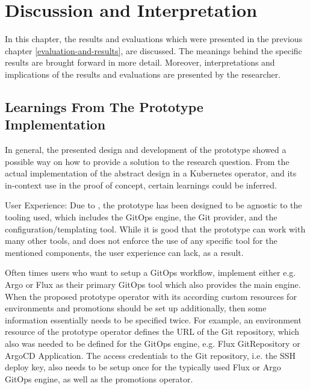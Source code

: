 \chapter{Discussion and Interpretation}
\label{discussion-and-interpretation}

In this chapter,
the results and evaluations which were presented in the previous chapter \ref{evaluation-and-results},
are discussed. The meanings behind the specific results are brought forward in more detail.
Moreover, interpretations and implications of the results and evaluations are presented by the researcher.


\section*{Learnings From The Prototype Implementation}

In general, the presented design and development of the prototype
showed a possible way on how to provide a solution to the research question.
From the actual implementation of the abstract design in a Kubernetes operator,
and its in-context use in the proof of concept,
certain learnings could be inferred.

User Experience:
Due to ,
the prototype has been designed to be agnostic to the tooling used, which includes the GitOps engine, the Git provider, and the configuration/templating tool.
While it is good that the prototype can work with many other tools,
and does not enforce the use of any specific tool for the mentioned components,
the user experience can lack, as a result.

Often times users who want to setup a GitOps workflow,
implement either e.g. Argo or Flux as their primary GitOps tool which also provides the main engine.
When the proposed prototype operator with its according custom resources for environments and promotions
should be set up additionally,
then some information essentially needs to be specified twice. For example,
an environment resource of the prototype operator defines the URL of the Git repository,
which also was needed to be defined for the GitOps engine, e.g. Flux GitRepository or ArgoCD Application.
%
The access credentials to the Git repository, i.e. the SSH deploy key,
also needs to be setup once for the typically used Flux or Argo GitOps engine,
as well as the promotions operator.

